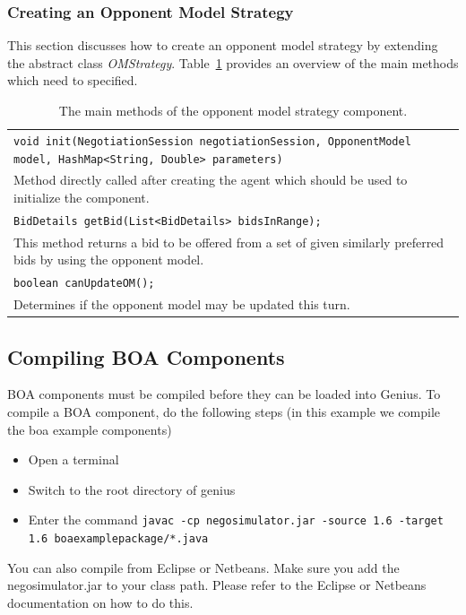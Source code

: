 \documentclass[]{article}
\begin{document}
\subsubsection{Creating an Opponent Model Strategy}
This section discusses how to create an opponent model strategy by extending the abstract class \textit{OMStrategy}. Table~\ref{tab:BOAoms} provides an overview of the main methods which need to specified.

\begin{table}[h]
\begin{tabular}{m{}}
\hline
\texttt{void init(NegotiationSession negotiationSession, OpponentModel model, HashMap<String, Double> parameters)}\\
Method directly called after creating the agent which should be used to initialize the component.\\
\hline
\texttt{BidDetails getBid(List<BidDetails> bidsInRange);}\\
This method returns a bid to be offered from a set of given similarly preferred bids by using the opponent model.\\
\hline
\texttt{boolean canUpdateOM();}\\
Determines if the opponent model may be updated this turn.\\
\hline
\end{tabular}
\caption{The main methods of the opponent model strategy component.}
\label{tab:BOAoms}
\end{table}

\subsection{Compiling BOA Components}
BOA components must be compiled before they can be loaded into Genius.
To compile a BOA component, do the following steps (in this example we compile the boa example components)
\begin{itemize}
\item Open a terminal 
\item Switch to the root directory of genius
\item Enter the command \texttt{javac -cp negosimulator.jar -source 1.6 -target 1.6 boaexamplepackage/*.java }
\end{itemize}

You can also compile from Eclipse or Netbeans. Make sure you add the negosimulator.jar to your class path. Please refer to the Eclipse or Netbeans documentation on how to do this.
\end{document}
